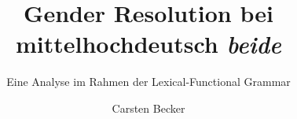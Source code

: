 \author{Carsten Becker}
\title{Gender Resolution bei mittelhochdeutsch \emph{beide}}
\subtitle{Eine Analyse im Rahmen der Lexical-Functional Grammar}
\renewcommand{\lsSeries}{ahl}
\renewcommand{\lsSeriesNumber}{1}%
\lsCoverTitleSizes{42pt}{14mm}%
\renewcommand{\lsID}{431}
